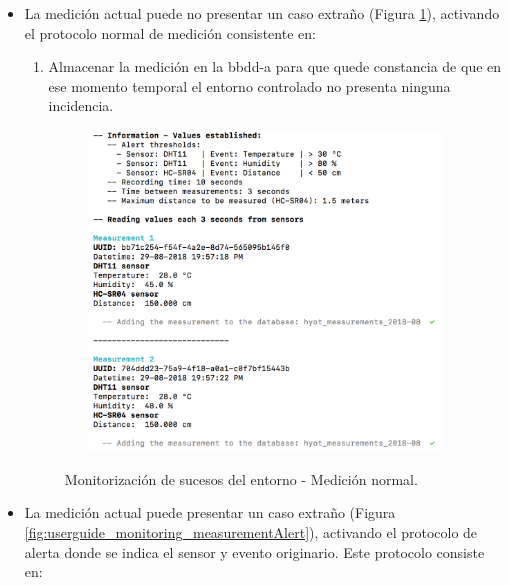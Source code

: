 \documentclass[12pt,a4paper, twoside]{report}
\begin{document}
	 \begin{itemize}
	 	\item La medición actual puede no presentar un caso extraño (Figura \ref{fig:userguide_monitoring_measurementOk}), activando el protocolo normal de medición consistente en:
	 	
	 		\begin{enumerate}
				\item Almacenar la medición en la \gls{bbdd-a} para que quede constancia de que en ese momento temporal el entorno controlado no presenta ninguna incidencia.
			\end{enumerate}
			
			\newpage
			
			\begin{figure}[!ht]   
				\caption{Monitorización de sucesos del entorno - Medición normal.} 
				\begin{center} 
					\includegraphics[width=12cm,height=8.5cm]{Images/userGuide/monitoring/measurementOk} \\
					\label{fig:userguide_monitoring_measurementOk} 
				\end{center}  
			\end{figure}	 
	 	
	 	\item La medición actual puede presentar un caso extraño (Figura \ref{fig:userguide_monitoring_measurementAlert}), activando el protocolo de alerta donde se indica el \gls{sensor} y evento originario. Este protocolo consiste en:
	 	 	

\end{itemize}
\end{document}
